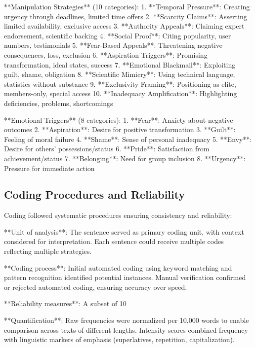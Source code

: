 **Manipulation Strategies** (10 categories):
1. **Temporal Pressure**: Creating urgency through deadlines, limited time offers
2. **Scarcity Claims**: Asserting limited availability, exclusive access
3. **Authority Appeals**: Claiming expert endorsement, scientific backing
4. **Social Proof**: Citing popularity, user numbers, testimonials
5. **Fear-Based Appeals**: Threatening negative consequences, loss, exclusion
6. **Aspiration Triggers**: Promising transformation, ideal states, success
7. **Emotional Blackmail**: Exploiting guilt, shame, obligation
8. **Scientific Mimicry**: Using technical language, statistics without substance
9. **Exclusivity Framing**: Positioning as elite, members-only, special access
10. **Inadequacy Amplification**: Highlighting deficiencies, problems, shortcomings

**Emotional Triggers** (8 categories):
1. **Fear**: Anxiety about negative outcomes
2. **Aspiration**: Desire for positive transformation
3. **Guilt**: Feeling of moral failure
4. **Shame**: Sense of personal inadequacy
5. **Envy**: Desire for others' possessions/status
6. **Pride**: Satisfaction from achievement/status
7. **Belonging**: Need for group inclusion
8. **Urgency**: Pressure for immediate action

\subsection{Coding Procedures and Reliability}

Coding followed systematic procedures ensuring consistency and reliability:

**Unit of analysis**: The sentence served as primary coding unit, with context considered for interpretation. Each sentence could receive multiple codes reflecting multiple strategies.

**Coding process**: Initial automated coding using keyword matching and pattern recognition identified potential instances. Manual verification confirmed or rejected automated coding, ensuring accuracy over speed.

**Reliability measures**: A subset of 10%

**Quantification**: Raw frequencies were normalized per 10,000 words to enable comparison across texts of different lengths. Intensity scores combined frequency with linguistic markers of emphasis (superlatives, repetition, capitalization).

